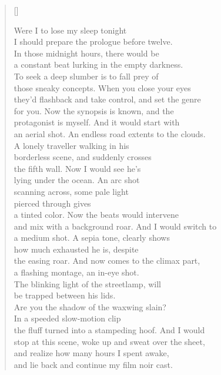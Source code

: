 \documentclass{book}
\begin{document}
\begin{verse}[\versewidth]

    Were I to lose my sleep tonight \\
    I should prepare the prologue before twelve. \\
    In those midnight hours, there would be\\
    a constant beat lurking in the empty darkness. \\
    To seek a deep slumber is to fall prey of \\
    those sneaky concepts. When you close your eyes\\
    they'd flashback and take control, and set the genre\\
    for you. Now the synopsis is known, and the\\
    protagonist is myself. And it would start with\\
    an aerial shot. An endless road extents to the clouds.\\
    A lonely traveller walking in his\\
    borderless scene, and suddenly crosses\\
    the fifth wall. Now I would see he's\\
    lying under the ocean. An arc shot\\
    scanning across, some pale light\\
    pierced through gives \\
    a tinted color. Now the beats would intervene\\
    and mix with a background roar. And I would switch to\\
    a medium shot. A sepia tone, clearly shows\\
    how much exhausted he is, despite\\
    the easing roar. And now comes to the climax part,\\
    a flashing montage, an in-eye shot. \\
    The blinking light of the streetlamp, will \\
    be trapped between his lids. \\
    Are you the shadow of the waxwing slain? \\
    In a speeded slow-motion clip\\
    the fluff turned into a stampeding hoof. And I would\\
    stop at this scene, woke up and sweat over the sheet,\\
    and realize how many hours I spent awake,\\
    and lie back and continue my film noir cast.\\
\end{verse}
\end{document}
